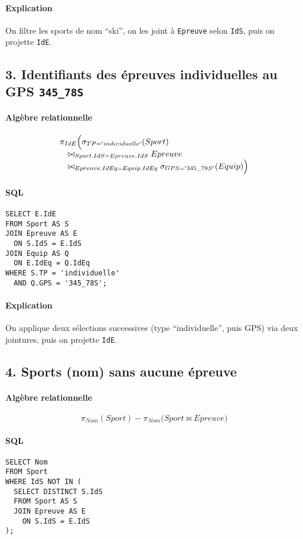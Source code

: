 \documentclass[a4paper,12pt]{article}
\begin{document}
\paragraph{Explication}
On filtre les sports de nom ``ski'', on les joint à \texttt{Epreuve} selon \texttt{IdS}, puis on projette \texttt{IdE}.

\subsection*{3. Identifiants des épreuves individuelles au GPS \texttt{345\_78S}}
\paragraph{Algèbre relationnelle}
\[
\begin{array}{l}
  \pi_{IdE}\Bigl(\sigma_{TP='individuelle'}(Sport) \\
  \quad\bowtie_{Sport.IdS=Epreuve.IdS}
  Epreuve \\
  \quad\bowtie_{Epreuve.IdEq=Equip.IdEq}  \sigma_{GPS='345\_78S'}(Equip)\Bigr)
\end{array}
\]
\paragraph{SQL}
\begin{verbatim}
SELECT E.IdE
FROM Sport AS S
JOIN Epreuve AS E
  ON S.IdS = E.IdS
JOIN Equip AS Q
  ON E.IdEq = Q.IdEq
WHERE S.TP = 'individuelle'
  AND Q.GPS = '345_78S';
\end{verbatim}
\paragraph{Explication}
On applique deux sélections successives (type ``individuelle'', puis GPS) via deux jointures, puis on projette \texttt{IdE}.

\subsection*{4. Sports (nom) sans aucune épreuve}
\paragraph{Algèbre relationnelle}
\[
  \pi_{Nom}(Sport) - \pi_{Nom}\bigl(Sport \bowtie Epreuve\bigr)
\]
\paragraph{SQL}
\begin{verbatim}
SELECT Nom
FROM Sport
WHERE IdS NOT IN (
  SELECT DISTINCT S.IdS
  FROM Sport AS S
  JOIN Epreuve AS E
    ON S.IdS = E.IdS
);
\end{verbatim}
\end{document}
